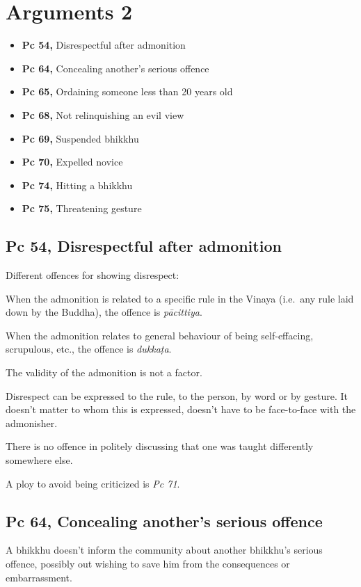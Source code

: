 \chapter{Arguments 2}

\begin{itemize}
\tightlist
\item
  \textbf{Pc 54,} Disrespectful after admonition
\item
  \textbf{Pc 64,} Concealing another's serious offence
\item
  \textbf{Pc 65,} Ordaining someone less than 20 years old
\item
  \textbf{Pc 68,} Not relinquishing an evil view
\item
  \textbf{Pc 69,} Suspended bhikkhu
\item
  \textbf{Pc 70,} Expelled novice
\item
  \textbf{Pc 74,} Hitting a bhikkhu
\item
  \textbf{Pc 75,} Threatening gesture
\end{itemize}

\section{Pc 54, Disrespectful after admonition}

Different offences for showing disrespect:

When the admonition is related to a specific rule in the Vinaya
(i.e.~any rule laid down by the Buddha), the offence is
\emph{pācittiya}.

When the admonition relates to general behaviour of being self-effacing,
scrupulous, etc., the offence is \emph{dukkaṭa}.

The validity of the admonition is not a factor.

Disrespect can be expressed to the rule, to the person, by word or by
gesture. It doesn't matter to whom this is expressed, doesn't have to be
face-to-face with the admonisher.

There is no offence in politely discussing that one was taught
differently somewhere else.

A ploy to avoid being criticized is \emph{Pc 71}.

\section{Pc 64, Concealing another's serious offence}

A bhikkhu doesn't inform the community about another bhikkhu's serious
offence, possibly out wishing to save him from the consequences or
embarrassment.

